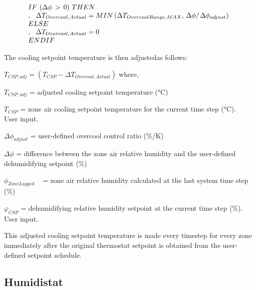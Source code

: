 \begin{equation}
  \begin{array}{l}
    IF\,\,(\Delta \phi \, > \,0)\,\,THEN \\
    ,\,\,\,\,\Delta {T_{Overcool,Actual}} = MIN\left( {\Delta {T_{OvercoolRange,MAX}},\,{{\Delta \phi } \mathord{\left/ {\vphantom {{\Delta \phi } {\Delta {\phi_{adjust}}}}} \right. } {\Delta {\phi_{adjust}}}}} \right) \\
    ELSE \\
    ,\,\,\,\,\Delta {T_{Overcool,Actual}} = 0 \\
    ENDIF
  \end{array}
\end{equation}

The cooling setpoint temperature is then adjustedas follows:

\({T_{CSP,adj}} = \left( {{T_{CSP}} - \Delta {T_{Overcool,Actual}}} \right)\) where,

\({T_{CSP,adj}}\) = adjusted cooling setpoint temperature (°C)

\({T_{CSP}}\) = zone air cooling setpoint temperature for the current time step (°C).~ User input.

\(\Delta {\phi_{adjust}}\) = user-defined overcool control ratio (\%/K)

\(\Delta \phi\) = difference between the zone air relative humidity and the user-defined dehumidifying setpoint (\%)

\({\phi_{ZoneLagged}}\) ~ = zone air relative humidity calculated at the last system time step (\%)

\({\varphi_{CSP}}\) = dehumidifying relative humidity setpoint at the current time step (\%).~ User input.

This adjusted cooling setpoint temperature is made every timestep for every zone immediately after the original thermostat setpoint is obtained from the user-defined setpoint schedule.

\subsection{Humidistat}\label{humidistat}

